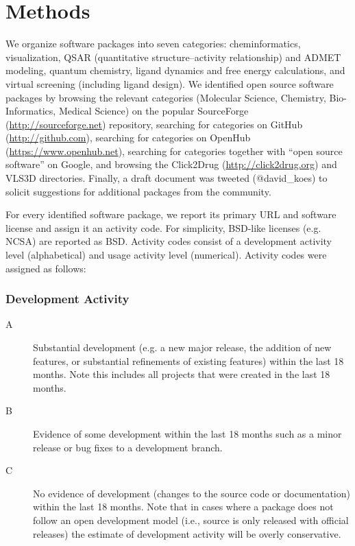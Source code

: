 \section{Methods}

We organize software packages into seven categories: cheminformatics, visualization, QSAR (quantitative structure–activity relationship) and ADMET modeling, quantum chemistry, ligand dynamics and free energy calculations, and virtual screening (including ligand design).
We identified open source software packages by browsing the relevant categories (Molecular Science, Chemistry, Bio-Informatics, Medical Science) on the popular SourceForge (\url{http://sourceforge.net}) repository, searching for categories on GitHub (\url{http://github.com}), searching for categories on OpenHub (\url{https://www.openhub.net}), searching for categories together with ``open source software'' on Google, and browsing the Click2Drug (\url{http://click2drug.org}) and VLS3D \cite{Villoutreix_2013} directories.  Finally, a draft document was tweeted (@david\_koes) to solicit suggestions for additional packages from the community.

For every identified software package, we report its primary URL and software license and assign it an activity code. For simplicity, BSD-like licenses (e.g. NCSA) are reported as BSD. Activity codes consist of a development activity level (alphabetical) and usage activity level (numerical). Activity codes were assigned as follows:
\subsubsection*{Development Activity}
\begin{description}
  \item[A] Substantial development (e.g. a new major release, the addition of new features, or substantial refinements of existing features) within the last 18 months. Note this includes all projects that were created in the last 18 months.
  \item[B] Evidence of some development within the last 18 months such as a minor release or bug fixes to a development branch.
  \item[C] No evidence of development (changes to the source code or documentation) within the last 18 months. Note that in cases where a package does not follow an open development model (i.e., source is only released with official releases) the estimate of development activity will be overly conservative.
\end{description}

